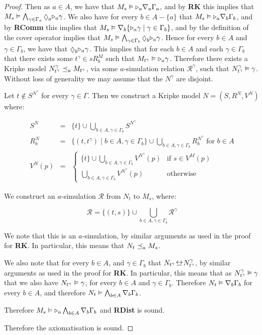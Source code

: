 \begin{proof}
Then as $a \in A$, we have that $M_s \vDash {\ensuremath{\mathopen{\triangleright}}}_a \nabla_a \Gamma_a$,
and by {\bf RK} this implies that $M_s \entails \bigwedge_{\gamma \in
\Gamma_a} \suspects_a \somerefs_a \gamma$. We also have for every $b \in A -
\{a\}$ that $M_s \vDash {\ensuremath{\mathopen{\triangleright}}}_a \nabla_b \Gamma_b$, and by {\bf RComm}
this implies that $M_s \vDash \nabla_b \{{\mathopen{\triangleright}}_a \gamma \mid \gamma \in
\Gamma_b\}$, and by the definition of the cover operator implies that $M_s
\entails \bigwedge_{\gamma \in \Gamma_b} \suspects_b \somerefs_a \gamma$.  Hence
for every $b \in A$ and $\gamma \in \Gamma_b$, we have that $\suspects_b
\somerefs_a \gamma$. This implies that for each $b \in A$ and each $\gamma \in
\Gamma_b$ that there exists some $t^{\gamma} \in sR^M_b$ such that $M_{t^\gamma}
\vDash {\ensuremath{\mathopen{\triangleright}}}_a \gamma$. Therefore there exists a Kripke model
$N^\gamma_{t^\gamma} \preceq_a M_{t^\gamma}$, via some $a$-simulation
relation $\mathcal{R}^\gamma$, such that $N^\gamma_{t^\gamma} \vDash \gamma$.
Without loss of generality we may assume that the $N^\gamma$ are disjoint.

Let $t \notin S^{N^\gamma}$ for every $\gamma \in \Gamma$.
Then we construct a Kripke model $N = (S, R^N, V^N)$ where:

\begin{eqnarray*}
S^N &=& \{t\} \cup \bigcup_{b \in A, \gamma \in \Gamma_b} S^{N^\gamma}\\
R^N_b &=& \{(t, t^{\gamma}) \mid b \in A, \gamma \in \Gamma_b\} 
\cup \bigcup_{b \in A, \gamma \in \Gamma_b} R^{N^\gamma}_b \text{ for $b \in A$}\\
V^N(p) &=& 
\begin{cases}
\{t\} \cup \bigcup_{b \in A, \gamma \in \Gamma_b} V^{N^\gamma}(p) & \text{if $s
\in V^M(p)$}\\
\bigcup_{b \in A, \gamma \in \Gamma_b} V^{N^\gamma}(p) & \text{otherwise}
\end{cases}
\end{eqnarray*}

We construct an $a$-simulation $\mathcal{R}$ from $N_t$ to $M_s$, where:

$$\mathcal{R} = \{(t, s)\} \cup \bigcup_{b \in A, \gamma \in \Gamma_b}
\mathcal{R}^\gamma$$

We note that this is an $a$-simulation, by similar arguments as used in the
proof for {\bf RK}. In particular, this means that $N_t \preceq_a M_s$.

We also note that for every $b \in A$, and $\gamma \in \Gamma_b$ that
$N_{t^\gamma} \bisim N^\gamma_{t^\gamma}$, by similar arguments as used in the
proof for {\bf RK}. In particular, this means that as $N^\gamma_{t^\gamma}
\vDash \gamma$ that we also have $N_{t^\gamma} \vDash \gamma$, for every $b
\in A$ and $\gamma \in \Gamma_b$. Therefore $N_t \vDash \nabla_b \Gamma_b$
for every $b \in A$, and therefore $N_t \vDash \bigwedge_{b \in A} \nabla_b
\Gamma_b$.

Therefore $M_s \vDash {\ensuremath{\mathopen{\triangleright}}}_a \bigwedge_{b \in A} \nabla_b \Gamma_b$ and
{\bf RDist} is sound.

Therefore the axiomatisation \axiomKF{} is sound.
\end{proof}

